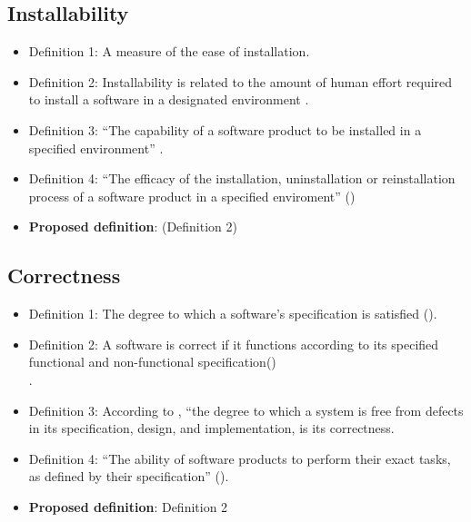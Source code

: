 \documentclass[letterpaper,cleveref]{lipics-v2019}
\theoremstyle{definition}
\begin{document}
\subsection{Installability}
\begin{itemize}
    \item{Definition 1:} A measure of the ease of installation.\\
	\item{Definition 2:} Installability is related to the amount of human effort required to install a software in a designated environment \cite{berander2005software}. \\
	\item{Definition 3:} ``The capability of a software product to be installed in a specified environment'' \cite{berander2005software}.\\
	\item{Definition 4:}  ``The efficacy of the installation, uninstallation or reinstallation process of a software product in a specified enviroment'' (\cite{iso201017043})\\
	\item {\textbf{Proposed definition}:} (Definition 2)
\end{itemize}

\subsection{Correctness}
\begin{itemize}
	\item{Definition 1:} The degree to which a software's specification is satisfied (\cite{berander2005software}).\\
	\item{Definition 2:} A software is correct if it functions according to its specified functional and non-functional specification(\cite{GhezziEtAl2003})\\.
	\item{Definition 3:} According to \cite{wilson2009quality}, ``the degree to which a system is free from defects in its specification, design, and implementation, is its correctness.\\
	\item{Definition 4:} ``The ability of software products to perform their exact tasks, as defined by their specification'' (\cite{meyer1988object}). \\
	\item{\textbf{Proposed definition}:} Definition 2
\end{itemize}	
	
\end{document}
